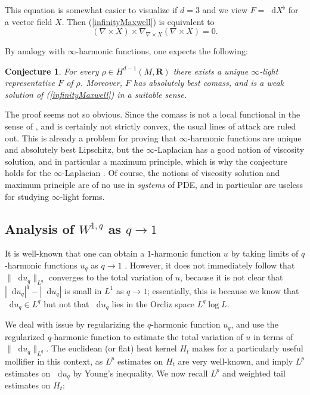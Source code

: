 \documentclass[reqno,11pt]{amsart}
\newcommand{\RR}{\mathbf{R}}
\newcommand*\dif{\mathop{}\!\mathrm{d}}
\newtheorem{conjecture}[theorem]{Conjecture}
\theoremstyle{definition}
\numberwithin{equation}{section}
\begin{document}
This equation is somewhat easier to visualize if $d = 3$ and we view $F = \dif X^\flat$ for a vector field $X$.
Then (\ref{infinityMaxwell}) is equivalent to 
$$(\nabla \times X) \times \nabla_{\nabla \times X} (\nabla \times X) = 0.$$

By analogy with $\infty$-harmonic functions, one expects the following:

\begin{conjecture}
For every $\rho \in H^{d - 1}(M, \RR)$ there exists a unique $\infty$-light representative $F$ of $\rho$.
Moreover, $F$ has absolutely best comass, and is a weak solution of (\ref{infinityMaxwell}) in a suitable sense.
\end{conjecture}

The proof seems not so obvious.
Since the comass is not a local functional in the sense of \cite{Crandall2008}, and is certainly not strictly convex, the usual lines of attack are ruled out.
This is already a problem for proving that $\infty$-harmonic functions are unique and absolutely best Lipschitz, but the $\infty$-Laplacian has a good notion of viscosity solution, and in particular a maximum principle, which is why the conjecture holds for the $\infty$-Laplacian \cite{Lindqvist14}.
Of course, the notions of viscosity solution and maximum principle are of no use in \emph{systems} of PDE, and in particular are useless for studying $\infty$-light forms.

\subsection{\texorpdfstring{Analysis of $W^{1, q}$ as $q \to 1$}{Analysis of Sobolev space as q approaches 1}}
It is well-known that one can obtain a $1$-harmonic function $u$ by taking limits of $q$-harmonic functions $u_q$ as $q \to 1$ \cite{Mazon14}.
However, it does not immediately follow that $\|\dif u_q\|_{L^q}$ converges to the total variation of $u$, because it is not clear that $|\dif u_q|^q - |\dif u_q|$ is small in $L^1$ as $q \to 1$; essentially, this is because we know that $\dif u_q \in L^q$ but not that $\dif u_q$ lies in the Orcliz space $L^q \log L$.

We deal with issue by regularizing the $q$-harmonic function $u_q$, and use the regularized $q$-harmonic function to estimate the total variation of $u$ in terms of $\|\dif u_q\|_{L^q}$.
The euclidean (or flat) heat kernel $H_t$ makes for a particularly useful mollifier in this context, as $L^p$ estimates on $H_t$ are very well-known, and imply $L^p$ estimates on $\dif u_q$ by Young's inequality.
We now recall $L^p$ and weighted tail estimates on $H_t$:
\end{document}
